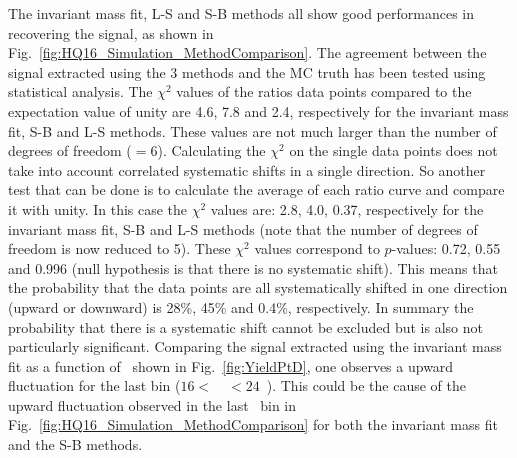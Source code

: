 The invariant mass fit, L-S and S-B methods all show good performances in recovering the signal, as shown in Fig.~\ref{fig:HQ16_Simulation_MethodComparison}.
The agreement between the signal extracted using the 3 methods and the MC truth has been tested using statistical analysis. The $\chi^2$ values
of the ratios data points compared to the expectation value of unity are 4.6, 7.8 and 2.4, respectively for the invariant mass fit, S-B and L-S methods.
These values are not much larger than the number of degrees of freedom ($=6$).
Calculating the $\chi^2$ on the single data points does not take into account correlated systematic shifts in a single direction. So another test that can be
done is to calculate the average of each ratio curve and compare it with unity. In this case the $\chi^2$ values are: 2.8, 4.0, 0.37, respectively for the invariant mass fit,
S-B and L-S methods (note that the number of degrees of freedom is now reduced to 5). These $\chi^2$ values correspond to $p$-values: 0.72, 0.55 and 0.996 (null hypothesis is
that there is no systematic shift).
This means that the probability that the data points are all systematically shifted in one direction (upward or downward) is 28\%, 45\% and 0.4\%, respectively.
In summary the probability that there is a systematic shift cannot be excluded but is also not particularly significant. Comparing the signal extracted using the invariant mass fit
as a function of \ptd\, shown in Fig.~\ref{fig:YieldPtD}, one observes a upward fluctuation for the last bin ($16 < $~\ptd~$<24$~\GeVc). This could be the cause of the upward fluctuation observed in the last \ptchjet\ bin
in Fig.~\ref{fig:HQ16_Simulation_MethodComparison} for both the invariant mass fit and the S-B methods.
